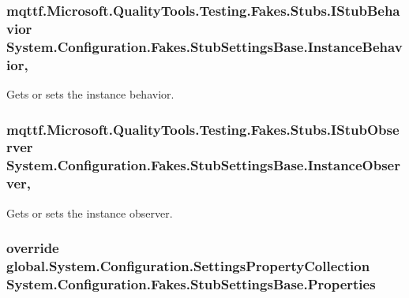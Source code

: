 \hypertarget{class_system_1_1_configuration_1_1_fakes_1_1_stub_settings_base_a6afcb7bc15b19e7b93850309828bb37b}{
\subsubsection[{Instance\-Behavior}]{\setlength{\rightskip}{0pt plus 5cm}mqttf.\-Microsoft.\-Quality\-Tools.\-Testing.\-Fakes.\-Stubs.\-I\-Stub\-Behavior System.\-Configuration.\-Fakes.\-Stub\-Settings\-Base.\-Instance\-Behavior\hspace{0.3cm}{\ttfamily [get]}, {\ttfamily [set]}}}\label{class_system_1_1_configuration_1_1_fakes_1_1_stub_settings_base_a6afcb7bc15b19e7b93850309828bb37b}


Gets or sets the instance behavior.

\hypertarget{class_system_1_1_configuration_1_1_fakes_1_1_stub_settings_base_a2168de50e811a8fe9ba458c95aab3583}{
\subsubsection[{Instance\-Observer}]{\setlength{\rightskip}{0pt plus 5cm}mqttf.\-Microsoft.\-Quality\-Tools.\-Testing.\-Fakes.\-Stubs.\-I\-Stub\-Observer System.\-Configuration.\-Fakes.\-Stub\-Settings\-Base.\-Instance\-Observer\hspace{0.3cm}{\ttfamily [get]}, {\ttfamily [set]}}}\label{class_system_1_1_configuration_1_1_fakes_1_1_stub_settings_base_a2168de50e811a8fe9ba458c95aab3583}


Gets or sets the instance observer.

\hypertarget{class_system_1_1_configuration_1_1_fakes_1_1_stub_settings_base_ad17eda40cee4d807d34d4f42a8cdc297}{
\subsubsection[{Properties}]{\setlength{\rightskip}{0pt plus 5cm}override global.\-System.\-Configuration.\-Settings\-Property\-Collection System.\-Configuration.\-Fakes.\-Stub\-Settings\-Base.\-Properties\hspace{0.3cm}{\ttfamily [get]}}}\label{class_system_1_1_configuration_1_1_fakes_1_1_stub_settings_base_ad17eda40cee4d807d34d4f42a8cdc297}


